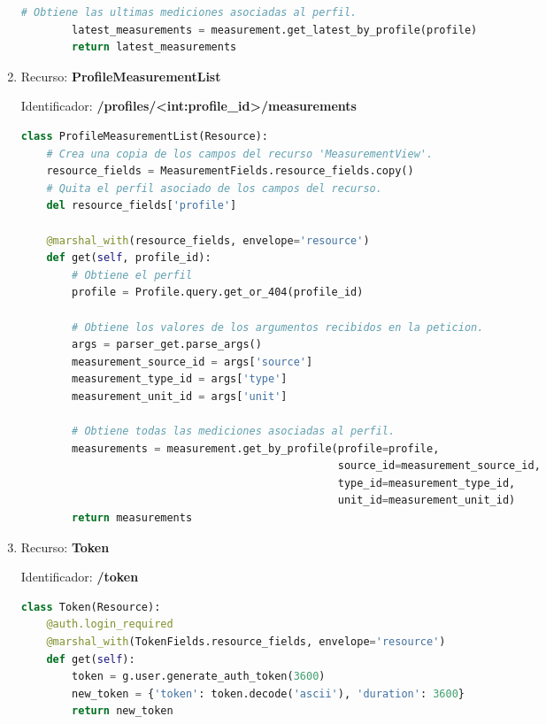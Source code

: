 \documentclass[a4paper,12pt]{article}
\begin{document}
\begin{enumerate}
\begin{lstlisting}[language=Python]
        # Obtiene las ultimas mediciones asociadas al perfil.
        latest_measurements = measurement.get_latest_by_profile(profile)
        return latest_measurements
\end{lstlisting}

\item Recurso: \textbf{ProfileMeasurementList}

Identificador: \textbf{/profiles/<int:profile\_id>/measurements}

\begin{lstlisting}[language=Python]
class ProfileMeasurementList(Resource):
    # Crea una copia de los campos del recurso 'MeasurementView'.
    resource_fields = MeasurementFields.resource_fields.copy()
    # Quita el perfil asociado de los campos del recurso.
    del resource_fields['profile']

    @marshal_with(resource_fields, envelope='resource')
    def get(self, profile_id):
        # Obtiene el perfil
        profile = Profile.query.get_or_404(profile_id)

        # Obtiene los valores de los argumentos recibidos en la peticion.
        args = parser_get.parse_args()
        measurement_source_id = args['source']
        measurement_type_id = args['type']
        measurement_unit_id = args['unit']

        # Obtiene todas las mediciones asociadas al perfil.
        measurements = measurement.get_by_profile(profile=profile,
                                                  source_id=measurement_source_id,
                                                  type_id=measurement_type_id,
                                                  unit_id=measurement_unit_id)
        return measurements
\end{lstlisting}

\item Recurso: \textbf{Token}

Identificador: \textbf{/token}

\begin{lstlisting}[language=Python]
class Token(Resource):
    @auth.login_required
    @marshal_with(TokenFields.resource_fields, envelope='resource')
    def get(self):
        token = g.user.generate_auth_token(3600)
        new_token = {'token': token.decode('ascii'), 'duration': 3600}
        return new_token
\end{lstlisting}

\end{enumerate}
\end{document}
